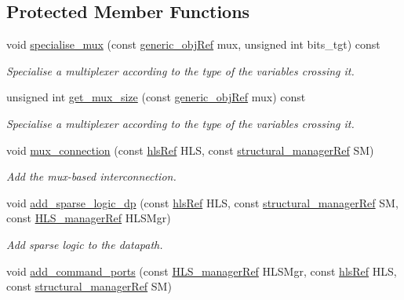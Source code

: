 \subsection*{Protected Member Functions}
\begin{DoxyCompactItemize}
\item 
void \hyperlink{classconn__binding_ae9a6eb2b8e5eb480e94a8a1f04ce58e4}{specialise\+\_\+mux} (const \hyperlink{generic__obj_8hpp_acb533b2ef8e0fe72e09a04d20904ca81}{generic\+\_\+obj\+Ref} mux, unsigned int bits\+\_\+tgt) const
\begin{DoxyCompactList}\small\item\em Specialise a multiplexer according to the type of the variables crossing it. \end{DoxyCompactList}\item 
unsigned int \hyperlink{classconn__binding_a81141f5a9d7905a26c53d13123c286b6}{get\+\_\+mux\+\_\+size} (const \hyperlink{generic__obj_8hpp_acb533b2ef8e0fe72e09a04d20904ca81}{generic\+\_\+obj\+Ref} mux) const
\begin{DoxyCompactList}\small\item\em Specialise a multiplexer according to the type of the variables crossing it. \end{DoxyCompactList}\item 
void \hyperlink{classconn__binding_ab815fc2d481fffaa79d9659e3808616b}{mux\+\_\+connection} (const \hyperlink{hls_8hpp_a75d0c73923d0ddfa28c4843a802c73a7}{hls\+Ref} H\+LS, const \hyperlink{structural__manager_8hpp_ab3136f0e785d8535f8d252a7b53db5b5}{structural\+\_\+manager\+Ref} SM)
\begin{DoxyCompactList}\small\item\em Add the mux-\/based interconnection. \end{DoxyCompactList}\item 
void \hyperlink{classconn__binding_a393ed99302e52c270d5756f789f2fc76}{add\+\_\+sparse\+\_\+logic\+\_\+dp} (const \hyperlink{hls_8hpp_a75d0c73923d0ddfa28c4843a802c73a7}{hls\+Ref} H\+LS, const \hyperlink{structural__manager_8hpp_ab3136f0e785d8535f8d252a7b53db5b5}{structural\+\_\+manager\+Ref} SM, const \hyperlink{hls__manager_8hpp_acd3842b8589fe52c08fc0b2fcc813bfe}{H\+L\+S\+\_\+manager\+Ref} H\+L\+S\+Mgr)
\begin{DoxyCompactList}\small\item\em Add sparse logic to the datapath. \end{DoxyCompactList}\item 
void \hyperlink{classconn__binding_abad9d4010da617d55dd3ba1a1eaf3bf1}{add\+\_\+command\+\_\+ports} (const \hyperlink{hls__manager_8hpp_acd3842b8589fe52c08fc0b2fcc813bfe}{H\+L\+S\+\_\+manager\+Ref} H\+L\+S\+Mgr, const \hyperlink{hls_8hpp_a75d0c73923d0ddfa28c4843a802c73a7}{hls\+Ref} H\+LS, const \hyperlink{structural__manager_8hpp_ab3136f0e785d8535f8d252a7b53db5b5}{structural\+\_\+manager\+Ref} SM)

\end{DoxyCompactItemize}
